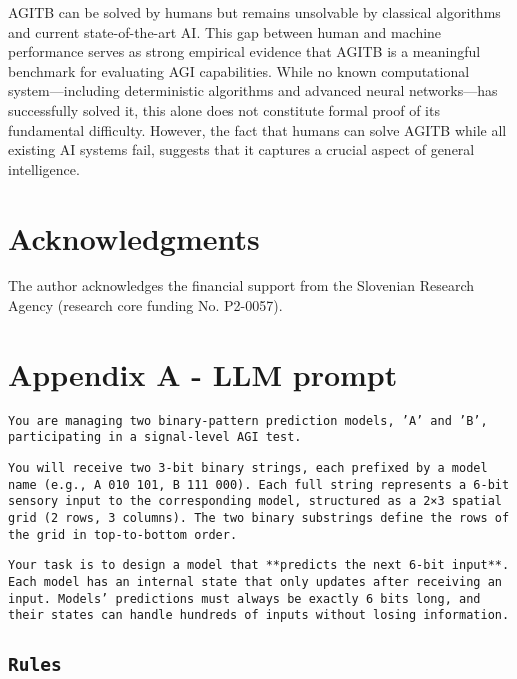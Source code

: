 \documentclass{article}
\begin{document}
AGITB can be solved by humans but remains unsolvable by classical algorithms and current state-of-the-art AI. This gap between human and machine performance serves as strong empirical evidence that AGITB is a meaningful benchmark for evaluating AGI capabilities. While no known computational system—including deterministic algorithms and advanced neural networks—has successfully solved it, this alone does not constitute formal proof of its fundamental difficulty. However, the fact that humans can solve AGITB while all existing AI systems fail, suggests that it captures a crucial aspect of general intelligence.

\section*{Acknowledgments}
The author acknowledges the financial support from the Slovenian Research Agency (research core funding No. P2-0057).

\newpage

\appendix
\section*{Appendix A - LLM prompt}

\texttt{You are managing two binary-pattern prediction models, 'A' and 'B', participating in a signal-level AGI test.}

\texttt{You will receive two 3-bit binary strings, each prefixed by a model name (e.g., A 010 101, B 111 000). Each full string represents a 6-bit sensory input to the corresponding model, structured as a 2×3 spatial grid (2 rows, 3 columns). The two binary substrings define the rows of the grid in top-to-bottom order.}

\texttt{Your task is to design a model that **{predicts the next 6-bit input}**. Each model has an internal state that only updates after receiving an input. Models' predictions must always be exactly 6 bits long, and their states can handle hundreds of inputs without losing information.}

\subsection*{\texttt{Rules}}
\end{document}
